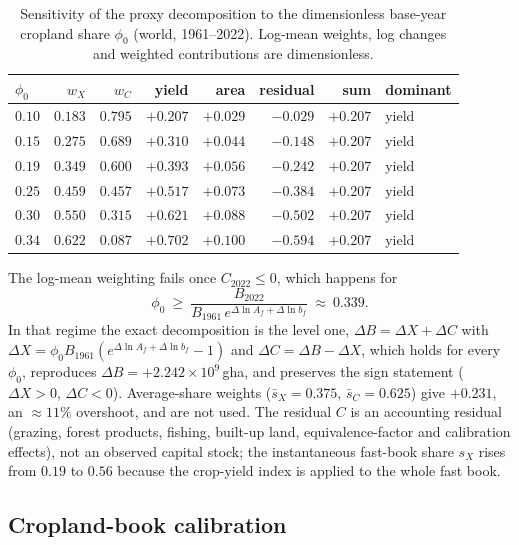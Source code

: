 \begin{table}[htbp]
\centering\small
\caption{Sensitivity of the proxy decomposition to the dimensionless base-year cropland share $\phi_0$ (world, 1961--2022). Log-mean weights, log changes and weighted contributions are dimensionless.}
\label{tab:si_phi0}
\begin{tabular}{l r r r r r r l}
\toprule
$\phi_0$ & $w_X$ & $w_C$ & yield & area & residual & sum & dominant \\
\midrule
$0.10$ & $0.183$ & $0.795$ & $+0.207$ & $+0.029$ & $-0.029$ & $+0.207$ & yield \\
$0.15$ & $0.275$ & $0.689$ & $+0.310$ & $+0.044$ & $-0.148$ & $+0.207$ & yield \\
$0.19$ & $0.349$ & $0.600$ & $+0.393$ & $+0.056$ & $-0.242$ & $+0.207$ & yield \\
$0.25$ & $0.459$ & $0.457$ & $+0.517$ & $+0.073$ & $-0.384$ & $+0.207$ & yield \\
$0.30$ & $0.550$ & $0.315$ & $+0.621$ & $+0.088$ & $-0.502$ & $+0.207$ & yield \\
$0.34$ & $0.622$ & $0.087$ & $+0.702$ & $+0.100$ & $-0.594$ & $+0.207$ & yield \\
\bottomrule
\end{tabular}
\end{table}

The log-mean weighting fails once $C_{2022}\le0$, which happens for
\begin{equation}
\phi_0\ \ge\ \frac{B_{2022}}{B_{1961}\,e^{\Delta\ln A_f+\Delta\ln b_f}}\ \approx\ 0.339 .
\end{equation}
In that regime the exact decomposition is the level one, $\Delta B=\Delta X+\Delta C$ with $\Delta X=\phi_0 B_{1961}(e^{\Delta\ln A_f+\Delta\ln b_f}-1)$ and $\Delta C=\Delta B-\Delta X$, which holds for every $\phi_0$, reproduces $\Delta B=+2.242\times10^{9}$\,gha, and preserves the sign statement ($\Delta X>0$, $\Delta C<0$). Average-share weights ($\bar s_X=0.375$, $\bar s_C=0.625$) give $+0.231$, an $\approx11\%$ overshoot, and are not used. The residual $C$ is an accounting residual (grazing, forest products, fishing, built-up land, equivalence-factor and calibration effects), not an observed capital stock; the instantaneous fast-book share $s_X$ rises from $0.19$ to $0.56$ because the crop-yield index is applied to the whole fast book.

\subsection{Cropland-book calibration}\label{si:cropland}

